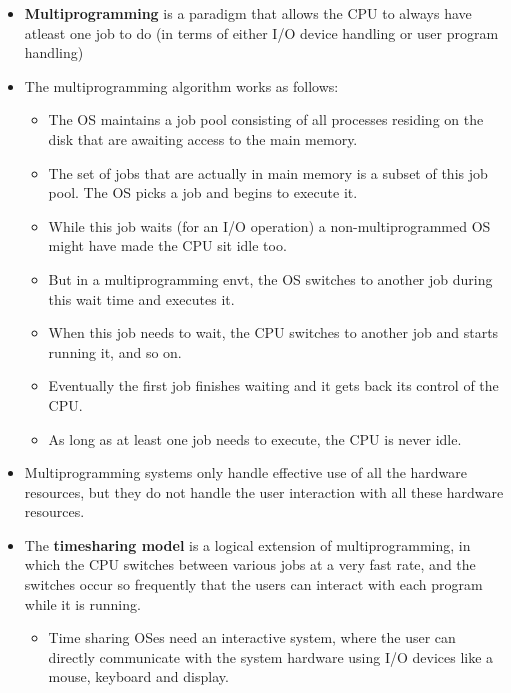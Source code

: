 \documentclass{article}
\theoremstyle{plain}
\theoremstyle{definition}
\begin{document}
\begin{itemize}
    \item \textbf{Multiprogramming} is a paradigm that allows the CPU to always have atleast one job to do (in terms of either I/O device handling or user program handling) 
    
    \item The multiprogramming algorithm works as follows:
    \begin{itemize}
        \item The OS maintains a job pool consisting of all processes residing on the disk that are awaiting access to the main memory. 
        \item The set of jobs that are actually in main memory is a subset of this job pool. The OS picks a job and begins to execute it.
        
        \item While this job waits (for an I/O operation) a non-multiprogrammed OS might have made the CPU sit idle too.
        
        \item But in a multiprogramming envt, the OS switches to another job during this wait time and executes it. 
        
        \item When this job needs to wait, the CPU switches to another job and starts running it, and so on. 
        
        \item Eventually the first job finishes waiting and it gets back its control of the CPU. 
        
        \item As long as at least one job needs to execute, the CPU is never idle. 
    \end{itemize}
    
    \item Multiprogramming systems only handle effective use of all the hardware resources, but they do not handle the user interaction with all these hardware resources. 
    
    \item The \textbf{timesharing model} is a logical extension of multiprogramming, in which the CPU switches between various jobs at a very fast rate, and the switches occur so frequently that the users can interact with each program while it is running.
    
    \begin{itemize}
        \item Time sharing OSes need an interactive system, where the user can directly communicate with the system hardware using I/O devices like a mouse, keyboard and display.
        

\end{itemize}
\end{itemize}
\end{document}
